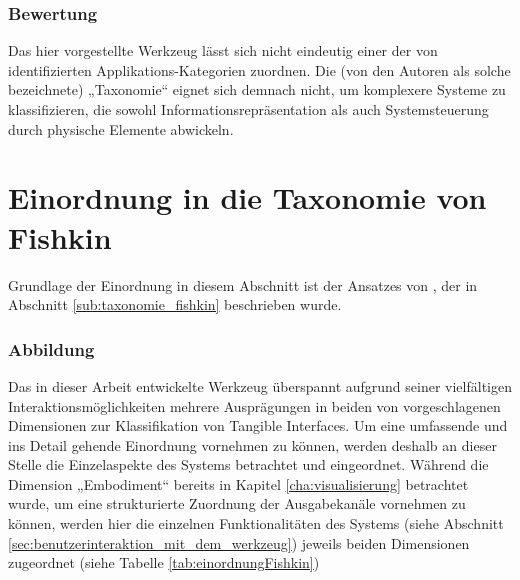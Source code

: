 \subsubsection{Bewertung}

Das hier vorgestellte Werkzeug lässt sich nicht eindeutig einer der von \citet{Klemmer04} identifizierten Applikations-Kategorien zuordnen. Die (von den Autoren als solche bezeichnete) „Taxonomie“ eignet sich demnach nicht, um komplexere Systeme zu klassifizieren, die sowohl Informationsrepräsentation als auch Systemsteuerung durch physische Elemente abwickeln.


\section{Einordnung in die Taxonomie von Fishkin} %
\label{sec:einordnung_in_die_taxonomie_von_fishkin}

Grundlage der Einordnung in diesem Abschnitt ist der Ansatzes von \citep{Fishkin04}, der in Abschnitt \ref{sub:taxonomie_fishkin} beschrieben wurde.

\subsubsection{Abbildung}
Das in dieser Arbeit entwickelte Werkzeug überspannt aufgrund seiner vielfältigen Interaktionsmöglichkeiten mehrere Ausprägungen in beiden von \citeauthor{Fishkin04} vorgeschlagenen Dimensionen zur Klassifikation von Tangible Interfaces. Um eine umfassende und ins Detail gehende Einordnung vornehmen zu können, werden deshalb an dieser Stelle die Einzelaspekte des Systems betrachtet und eingeordnet. Während die Dimension „Embodiment“ bereits in Kapitel \ref{cha:visualisierung} betrachtet wurde, um eine strukturierte Zuordnung der Ausgabekanäle vornehmen zu können, werden hier die einzelnen Funktionalitäten des Systems (siehe Abschnitt \ref{sec:benutzerinteraktion_mit_dem_werkzeug}) jeweils beiden Dimensionen zugeordnet (siehe Tabelle \ref{tab:einordnungFishkin})

